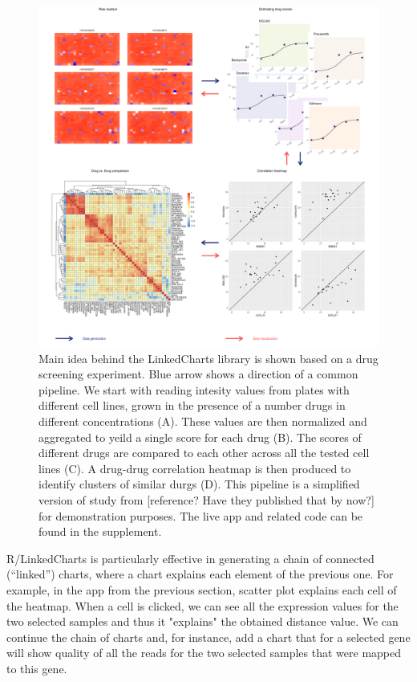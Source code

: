 \documentclass[twocolumn,10pt]{article}
\begin{document}
\begin{figure}
	\includegraphics[width=\textwidth]{FigC/figC.png}
	\caption{Main idea behind the LinkedCharts library is shown based on a drug screening experiment. Blue arrow shows a direction of a common pipeline. We start with reading intesity values from plates with different cell lines, grown in the presence of a number drugs in different concentrations (A). These values are then normalized and aggregated to yeild a single score for each drug (B). The scores of different drugs are compared to each other across all the tested cell lines (C). A drug-drug correlation heatmap is then produced to identify clusters of similar durgs (D). This pipeline is a simplified version of study from [reference? Have they published that by now?] for demonstration purposes. The live app and related code can be found in the supplement.}
	\label{FigC}
\end{figure}

R/LinkedCharts is particularly effective in generating a chain of connected (``linked'') charts, where a chart explains each element of the previous one. For example, in the app from the previous section, scatter plot explains each cell of the heatmap. When a cell is clicked, we can see all the expression values for the two selected samples and thus it "explains" the obtained distance value. We can continue the chain of charts and, for instance, add a chart that for a selected gene will show quality of all the reads for the two selected samples that were mapped to this gene.
\end{document}
